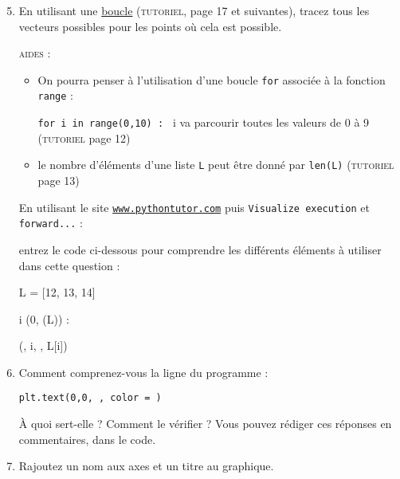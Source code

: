 \documentclass[11pt]{article}
\begin{document}
 \begin{enumerate}
 
 \setcounter{enumi}{4}
 \item En utilisant une \underline{boucle} (\textsc{tutoriel}, page 17 et suivantes), tracez tous les vecteurs possibles pour les points où cela est possible.
 
 
 \smallskip
 
 
 \textsc{aides : }
 \begin{itemize}
 \item On pourra penser à l'utilisation d'une boucle \texttt{for} associée à la fonction \texttt{range} : 
 
 \texttt{for i in range(0,10) : } i va parcourir toutes les valeurs de 0 à 9 (\textsc{tutoriel} page 12)
  \item le nombre d'éléments d'une liste \texttt{L} peut être donné par \texttt{len(L)} (\textsc{tutoriel} page 13)
 \end{itemize}

 
 En utilisant le site \href{http://www.pythontutor.com/visualize.html\#mode=display}{\texttt{www.pythontutor.com}} puis \texttt{Visualize execution} et \texttt{forward...} : 
 
 entrez le code ci-dessous pour comprendre les différents éléments à utiliser dans cette question : 
 
 
 
 \begin{center}
\begin{python}{0.7}
  L = [12, 13, 14]
  
  \for i \dans \range(0, \len(L)) : 
  
  \tabis \print(, i, , L[i])
 \end{python}             \end{center}

 
 
 
 
 
 \smallskip
 
 
 \item Comment comprenez-vous la ligne du programme : 
 
 \texttt{plt.text(0,0, , color = )}
 
 
 À quoi sert-elle ? Comment le vérifier ? Vous pouvez rédiger ces réponses en commentaires, dans le code.
 
 
 
 \item Rajoutez un nom aux axes et un titre au graphique.

 
 \end{enumerate}
\end{document}
